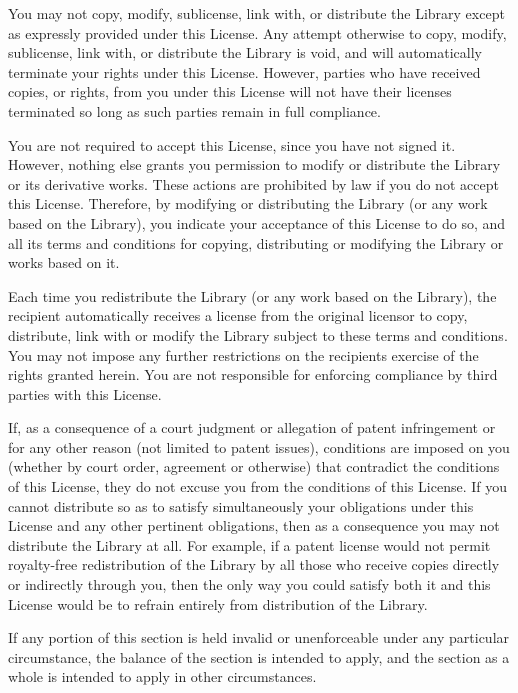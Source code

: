 \begin{DoxyEnumerate}
\item You may not copy, modify, sublicense, link with, or distribute the Library except as expressly provided under this License. Any attempt otherwise to copy, modify, sublicense, link with, or distribute the Library is void, and will automatically terminate your rights under this License. However, parties who have received copies, or rights, from you under this License will not have their licenses terminated so long as such parties remain in full compliance.
\item You are not required to accept this License, since you have not signed it. However, nothing else grants you permission to modify or distribute the Library or its derivative works. These actions are prohibited by law if you do not accept this License. Therefore, by modifying or distributing the Library (or any work based on the Library), you indicate your acceptance of this License to do so, and all its terms and conditions for copying, distributing or modifying the Library or works based on it.
\item Each time you redistribute the Library (or any work based on the Library), the recipient automatically receives a license from the original licensor to copy, distribute, link with or modify the Library subject to these terms and conditions. You may not impose any further restrictions on the recipients\textquotesingle{} exercise of the rights granted herein. You are not responsible for enforcing compliance by third parties with this License.
\item If, as a consequence of a court judgment or allegation of patent infringement or for any other reason (not limited to patent issues), conditions are imposed on you (whether by court order, agreement or otherwise) that contradict the conditions of this License, they do not excuse you from the conditions of this License. If you cannot distribute so as to satisfy simultaneously your obligations under this License and any other pertinent obligations, then as a consequence you may not distribute the Library at all. For example, if a patent license would not permit royalty-\/free redistribution of the Library by all those who receive copies directly or indirectly through you, then the only way you could satisfy both it and this License would be to refrain entirely from distribution of the Library.
\end{DoxyEnumerate}

If any portion of this section is held invalid or unenforceable under any particular circumstance, the balance of the section is intended to apply, and the section as a whole is intended to apply in other circumstances.

